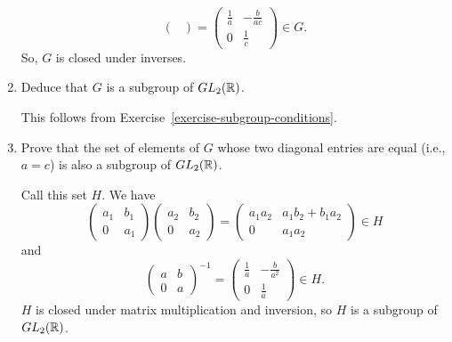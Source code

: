 \begin{enumerate}
\begin{solution}
\begin{equation*}
\begin{pmatrix}
      \end{pmatrix}
      =
      \begin{pmatrix}
        \frac1a & -\frac{b}{ac} \\[3pt]
        0 & \frac1c
      \end{pmatrix} \in G.
    \end{equation*}
    So, $G$ is closed under inverses.
  \end{solution}
\item Deduce that $G$ is a subgroup of $GL_2(\mathbb{R})$.
  \begin{solution}
    This follows from Exercise~\ref{exercise-subgroup-conditions}.
  \end{solution}
\item Prove that the set of elements of $G$ whose two diagonal entries
  are equal (i.e., $a = c$) is also a subgroup of $GL_2(\mathbb{R})$.
  \begin{solution}
    Call this set $H$. We have
    \begin{equation*}
      \begin{pmatrix}
        a_1 & b_1 \\ 0 & a_1
      \end{pmatrix}
      \begin{pmatrix}
        a_2 & b_2 \\ 0 & a_2
      \end{pmatrix}
      =
      \begin{pmatrix}
        a_1a_2 & a_1b_2 + b_1a_2 \\
        0 & a_1a_2
      \end{pmatrix}
      \in H
    \end{equation*}
    and
    \begin{equation*}
      \begin{pmatrix}
        a & b \\ 0 & a
      \end{pmatrix}^{-1}
      =
      \begin{pmatrix}
        \frac1a & -\frac{b}{a^2} \\[3pt]
        0 & \frac1a
      \end{pmatrix}
      \in H.
    \end{equation*}
    $H$ is closed under matrix multiplication and inversion, so $H$ is
    a subgroup of $GL_2(\mathbb{R})$.
  \end{solution}
\end{enumerate}
